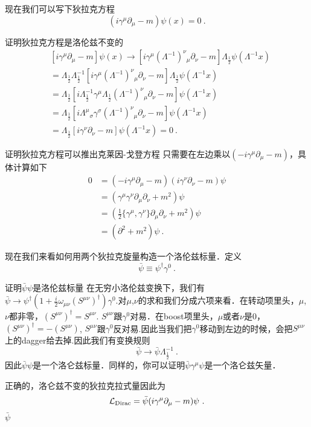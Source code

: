现在我们可以写下狄拉克方程
\begin{equation}
(i\gamma^\mu \partial_\mu - m)\psi(x)=0~.
\end{equation}
\begin{exercise}{证明狄拉克方程是洛伦兹不变的}
\begin{align}\nonumber
& [i\gamma^\mu\partial_\mu - m]\psi(x)\rightarrow [i\gamma^\mu(\Lambda^{-1})^\nu{}_\mu\partial_\nu - m]\Lambda_{\frac{1}{2}}\psi(\Lambda^{-1}x) \\\nonumber
& = \Lambda_{\frac{1}{2}}\Lambda^{-1}_{\frac{1}{2}}[i\gamma^\mu(\Lambda^{-1})^\nu{}_\mu\partial_\nu-m]\Lambda_{\frac{1}{2}}\psi(\Lambda^{-1}x) \\\nonumber
& =  \Lambda_{\frac{1}{2}}[i\Lambda_{\frac{1}{2}}^{-1}\gamma^\mu \Lambda_{\frac{1}{2}}(\Lambda^{-1})^\nu{}_\mu\partial_\nu - m]\psi(\Lambda^{-1}x) \\\nonumber
& = \Lambda_{\frac{1}{2} } [i\Lambda^\mu{}_\sigma\gamma^\sigma(\Lambda^{-1})^\nu{}_\mu\partial_\nu - m]\psi(\Lambda^{-1}x) \\
& = \Lambda_{\frac{1}{2}} [i \gamma^\nu\partial_\nu - m]\psi(\Lambda^{-1}x) = 0~.
\end{align}
\end{exercise}
\begin{exercise}{证明狄拉克方程可以推出克莱因-戈登方程}
只需要在左边乘以$(-i\gamma^\mu\partial_\mu - m)$，具体计算如下
\begin{align}\nonumber
0 & =(-i\gamma^\mu\partial_\mu-m)(i\gamma^\nu\partial_\nu-m)\psi \\\nonumber
& = (\gamma^\mu\gamma^\nu\partial_\mu\partial_\nu+m^2)\psi \\\nonumber
& = (\frac{1}{2}\{\gamma^\mu,\gamma^\nu\}\partial_\mu\partial_\nu+m^2)\psi \\
& = (\partial^2+m^2)\psi ~.
\end{align}
\end{exercise}
现在我们来看如何用两个狄拉克旋量构造一个洛伦兹标量．定义
\begin{equation}
\bar \psi \equiv \psi^\dagger \gamma^0~.
\end{equation}
\begin{exercise}{证明$\bar\psi \psi$是洛伦兹标量}
在无穷小洛伦兹变换下，我们有$\bar\psi \rightarrow \psi^\dagger(1+\frac{i}{2}\omega_{\mu\nu}(S^{\mu\nu})^\dagger)\gamma^0$.对$\mu$,$\nu$的求和我们分成六项来看．在转动项里头，$\mu$, $\nu$都非零，$(S^{\mu\nu})^\dagger = S^{\mu\nu}$. $S^{\mu\nu}$跟$\gamma^0$对易．在boost项里头，$\mu$或者$\nu$是0，$(S^{\mu\nu})^\dagger = -(S^{\mu\nu})$, $S^{\mu\nu}$跟$\gamma^0$反对易.因此当我们把$\gamma^0$移动到左边的时候，会把$S^{\mu\nu}$上的dagger给去掉.因此我们有变换规则
\begin{equation}
\bar \psi \rightarrow \bar\psi \Lambda_{\frac{1}{2}}^{-1}~.
\end{equation}
因此$\bar\psi\psi$是一个洛仑兹标量．同样的，你可以证明$\bar\psi\gamma^\mu\psi$是一个洛仑兹矢量．
\end{exercise}
正确的，洛仑兹不变的狄拉克拉式量因此为
\begin{equation}
\mathcal L_{\rm Dirac} = \bar\psi (i\gamma^\mu\partial_\mu - m)\psi~.
\end{equation}
$\bar \psi$


